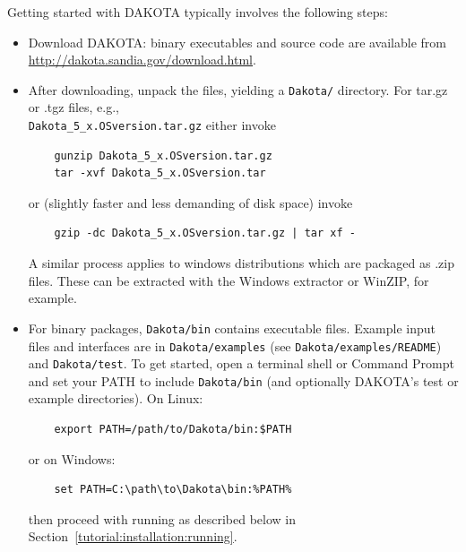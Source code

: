 Getting started with DAKOTA typically involves the following steps:
\begin{itemize}
  \item Download DAKOTA: binary executables and source code are
    available from\\
    \url{http://dakota.sandia.gov/download.html}.

  \item After downloading, unpack the files, yielding a {\tt Dakota/}
    directory.  For tar.gz or .tgz files, e.g.,\\
    \texttt{Dakota\_5\_x.OSversion.tar.gz} either invoke
    \begin{small}
\begin{verbatim}
    gunzip Dakota_5_x.OSversion.tar.gz
    tar -xvf Dakota_5_x.OSversion.tar
\end{verbatim}
    \end{small}
    or (slightly faster and less demanding of disk space) invoke
    \begin{small}
\begin{verbatim}
    gzip -dc Dakota_5_x.OSversion.tar.gz | tar xf -
\end{verbatim}
    \end{small}
    A similar process applies to windows distributions which are
    packaged as .zip files.  These can be extracted with the Windows
    extractor or WinZIP, for example.

  \item For binary packages, {\tt Dakota/bin} contains executable
    files. Example input files and interfaces are in
    \texttt{Dakota/examples} (see \texttt{Dakota/examples/README}) and
    \texttt{Dakota/test}.  To get started, open a terminal shell or
    Command Prompt and set your PATH to include {\tt Dakota/bin} (and
    optionally DAKOTA's test or example directories).  On Linux:
    \begin{small}
\begin{verbatim}
    export PATH=/path/to/Dakota/bin:$PATH
\end{verbatim}
    \end{small}
    or on Windows:
    \begin{small}
\begin{verbatim}
    set PATH=C:\path\to\Dakota\bin:%PATH%
\end{verbatim}
    \end{small}
    then proceed with running as described below in 
    Section~\ref{tutorial:installation:running}.


\end{itemize}

